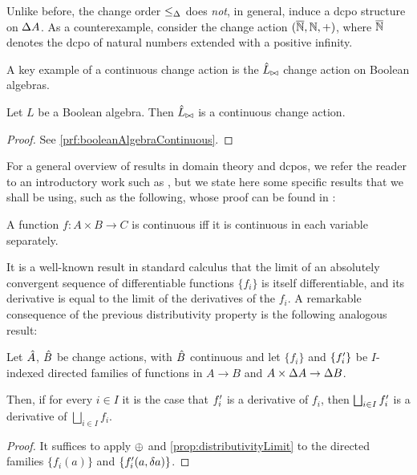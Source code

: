 Unlike before, the change order $\leq_\Delta$ does \emph{not}, in general,
induce a dcpo structure on $\Delta A$. As a counterexample, consider 
the change action $(\overline{\mathbb{N}}, \mathbb{N}, +)$, where $\overline{\mathbb{N}}$ denotes the dcpo of natural numbers
extended with a positive infinity.

A key example of a continuous change action is the $\hat{L}_{\bowtie}$ change
action on Boolean algebras.

\begin{prop}[name=Boolean algebra continuity, restate=booleanAlgebraContinuous]
  \label{prop:booleanAlgebraContinuous}
  Let $L$ be a Boolean algebra. Then $\hat{L}_{\bowtie}$ is a continuous
  change action.
\end{prop}
\ifproofs
\begin{proof}
  See \cref{prf:booleanAlgebraContinuous}.
\end{proof}
\fi

For a general overview of results in domain theory and dcpos, we refer the reader to an
introductory work such as \cite{abramsky1994domain}, but we state here some specific results that
we shall be using, such as the following, whose proof can be found in 
\cite[Lemma~3.2.6]{abramsky1994domain}:

\begin{prop}
  \label{prop:distributivityLimit}
  A function $f : A \times B \rightarrow C$ is continuous iff it is continuous in each variable
  separately.
\end{prop}

It is a well-known result in standard calculus that the limit of an absolutely convergent sequence of
differentiable functions $\{f_i\}$ is itself differentiable, and its derivative is equal to the limit
of the derivatives of the $f_i$. A remarkable consequence of the previous distributivity property
is the following analogous result:

\begin{corollary}
  \label{cor:diffContinuous}
  Let $\hat{A}$, $\hat{B}$ be change actions, with $\hat{B}$ continuous and let $\{f_i\}$ and $\{f_i'\}$ be
  $I$-indexed directed families of functions in $A \rightarrow B$ and $A \times \Delta A \rightarrow \Delta B$.

  Then, if for every $i \in I$ it is the case that $f_i'$ is a derivative of $f_i$, then $\bigsqcup_{i \in I} f_i'$ is
  a derivative of $\bigsqcup_{i \in I} f_i $.
\end{corollary}
\ifproofs
\begin{proof}
  It suffices to apply $\oplus$ and \cref{prop:distributivityLimit} to the directed families $\{ f_i(a) \}$ and
  $\{ f_i'(a, \delta a) \}$.
\end{proof}
\fi

